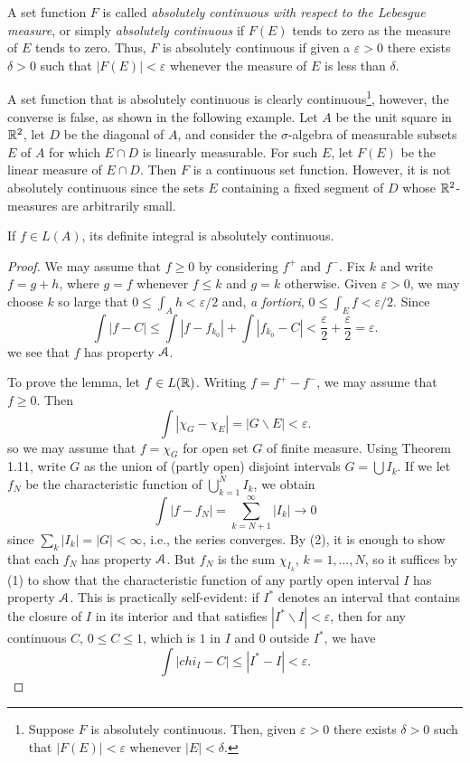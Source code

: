 A set function $F$ is called \emph{absolutely continuous with respect to
  the Lebesgue measure}, or simply \emph{absolutely continuous} if $F(E)$
tends to zero as the measure of $E$ tends to zero. Thus, $F$ is absolutely
continuous if given a $\varepsilon>0$ there exists $\delta>0$ such that
$|F(E)|<\varepsilon$ whenever the measure of $E$ is less than $\delta$.

A set function that is absolutely continuous is clearly
continuous\footnote{Suppose $F$ is absolutely continuous. Then, given
  $\varepsilon>0$ there exists $\delta>0$ such that $|F(E)|<\varepsilon$
  whenever $|E|<\delta$.}, however, the converse is false, as shown in the
following example. Let $A$ be the unit square in $\mathbb{R}^2$, let $D$ be the
diagonal of $A$, and consider the $\sigma$-algebra of measurable subsets
$E$ of $A$ for which $E\cap D$ is linearly measurable. For such $E$, let
$F(E)$ be the linear measure of $E\cap D$. Then $F$ is a continuous set
function. However, it is not absolutely continuous since the sets $E$
containing a fixed segment of $D$ whose $\mathbb{R}^2$-measures are arbitrarily
small.

\begin{theorem}[7.1]
If $f\in L(A)$, its definite integral is absolutely continuous.
\end{theorem}
\begin{proof}
We may assume that $f\geq 0$ by considering $f^+$ and $f^-$. Fix $k$ and
write $f=g+h$, where $g=f$ whenever $f\leq k$ and $g=k$ otherwise. Given
$\varepsilon>0$, we may choose $k$ so large that $0\leq\int_A
h<\varepsilon/2$ and, \emph{a fortiori}, $0\leq\int_E f<\varepsilon/2$.
Since
\[
\int|f-C|\leq\int|f-f_{k_0}|+\int|f_{k_0}-C|<\frac{\varepsilon}{2}+\frac{\varepsilon}{2}=\varepsilon.
\]
we see that $f$ has property $\mathcal{A}$.

To prove the lemma, let $f\in L(\mathbb{R})$. Writing $f=f^+-f^-$, we may assume
that $f\geq 0$. Then
\[
\int|\chi_G-\chi_E|=|G\smallsetminus E|<\varepsilon.
\]
so we may assume that $f=\chi_G$ for open set $G$ of finite measure. Using
Theorem 1.11, write $G$ as the union of (partly open) disjoint intervals
$G=\bigcup I_k$. If we let $f_N$ be the characteristic function of
$\bigcup_{k=1}^N I_k$, we obtain
\[
\int|f-f_N|=\sum_{k=N+1}^\infty|I_k|\to 0
\]
since $\sum_k|I_k|=|G|<\infty$, i.e., the series converges. By (2), it is
enough to show that each $f_N$ has property $\mathcal{A}$. But $f_N$ is the sum
$\chi_{I_k}$, $k=1,\dotsc,N$, so it suffices by (1) to show that the
characteristic function of any partly open interval $I$ has property
$\mathcal{A}$. This is practically self-evident: if $I^*$ denotes an interval
that contains the closure of $I$ in its interior and that satisfies
$|I^*\smallsetminus I|<\varepsilon$, then for any continuous $C$, $0\leq
C\leq 1$, which is $1$ in $I$ and $0$ outside $I^*$, we have
\[
\int|chi_I-C|\leq|I^*-I|<\varepsilon.
\]
\end{proof}


